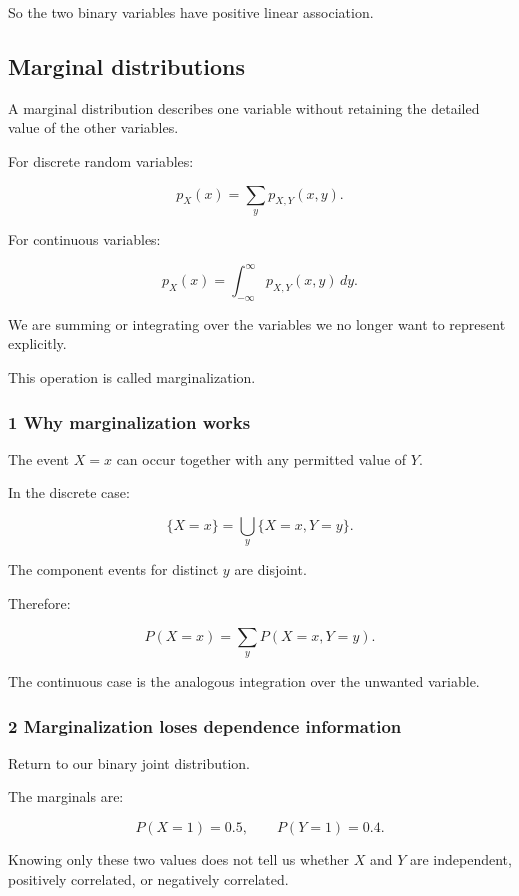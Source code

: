 So the two binary variables have positive linear association.

\subsection{Marginal distributions}\label{02-foundations-ii-ch023-marginal-distributions}

A marginal distribution describes one variable without retaining the detailed value of the other variables.

For discrete random variables:

\[
 \boxed{ p_X(x)=\sum_yp_{X,Y}(x,y) }.
\]

For continuous variables:

\[
 \boxed{ p_X(x)= \int_{-\infty}^{\infty} p_{X,Y}(x,y)\,dy }.
\]

We are summing or integrating over the variables we no longer want to represent explicitly.

This operation is called marginalization.

\subsubsection{1 Why marginalization works}\label{02-foundations-ii-ch023-why-marginalization-works}

The event \(X=x\) can occur together with any permitted value of \(Y\).

In the discrete case:

\[
 \{X=x\} = \bigcup_y\{X=x,Y=y\}.
\]

The component events for distinct \(y\) are disjoint.

Therefore:

\[
 P(X=x)=\sum_yP(X=x,Y=y).
\]

The continuous case is the analogous integration over the unwanted variable.

\subsubsection{2 Marginalization loses dependence information}\label{02-foundations-ii-ch023-marginalization-loses-dependence-information}

Return to our binary joint distribution.

The marginals are:

\[
 P(X=1)=0.5, \qquad P(Y=1)=0.4.
\]

Knowing only these two values does not tell us whether \(X\) and \(Y\) are independent, positively correlated, or negatively correlated.

